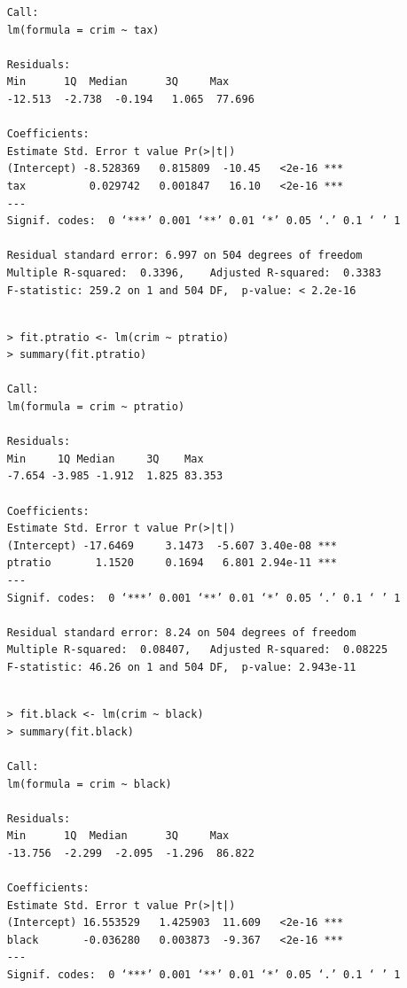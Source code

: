 \documentclass{article}
\begin{document}
\begin{itemize}
\begin{program}
\begin{verbatim}
	Call:
	lm(formula = crim ~ tax)
	
	Residuals:
	Min      1Q  Median      3Q     Max 
	-12.513  -2.738  -0.194   1.065  77.696 
	
	Coefficients:
	Estimate Std. Error t value Pr(>|t|)    
	(Intercept) -8.528369   0.815809  -10.45   <2e-16 ***
	tax          0.029742   0.001847   16.10   <2e-16 ***
	---
	Signif. codes:  0 ‘***’ 0.001 ‘**’ 0.01 ‘*’ 0.05 ‘.’ 0.1 ‘ ’ 1
	
	Residual standard error: 6.997 on 504 degrees of freedom
	Multiple R-squared:  0.3396,	Adjusted R-squared:  0.3383 
	F-statistic: 259.2 on 1 and 504 DF,  p-value: < 2.2e-16
	
	\end{verbatim}
\end{program}



\begin{program}
	\begin{verbatim}
	> fit.ptratio <- lm(crim ~ ptratio)
	> summary(fit.ptratio)
	
	Call:
	lm(formula = crim ~ ptratio)
	
	Residuals:
	Min     1Q Median     3Q    Max 
	-7.654 -3.985 -1.912  1.825 83.353 
	
	Coefficients:
	Estimate Std. Error t value Pr(>|t|)    
	(Intercept) -17.6469     3.1473  -5.607 3.40e-08 ***
	ptratio       1.1520     0.1694   6.801 2.94e-11 ***
	---
	Signif. codes:  0 ‘***’ 0.001 ‘**’ 0.01 ‘*’ 0.05 ‘.’ 0.1 ‘ ’ 1
	
	Residual standard error: 8.24 on 504 degrees of freedom
	Multiple R-squared:  0.08407,	Adjusted R-squared:  0.08225 
	F-statistic: 46.26 on 1 and 504 DF,  p-value: 2.943e-11
	
	\end{verbatim}
\end{program}


\begin{program}
	\begin{verbatim}
	> fit.black <- lm(crim ~ black)
	> summary(fit.black)
	
	Call:
	lm(formula = crim ~ black)
	
	Residuals:
	Min      1Q  Median      3Q     Max 
	-13.756  -2.299  -2.095  -1.296  86.822 
	
	Coefficients:
	Estimate Std. Error t value Pr(>|t|)    
	(Intercept) 16.553529   1.425903  11.609   <2e-16 ***
	black       -0.036280   0.003873  -9.367   <2e-16 ***
	---
	Signif. codes:  0 ‘***’ 0.001 ‘**’ 0.01 ‘*’ 0.05 ‘.’ 0.1 ‘ ’ 1
	

\end{verbatim}
\end{program}
\end{itemize}
\end{document}

